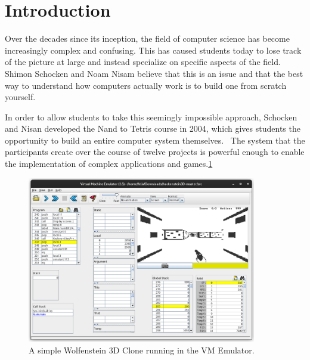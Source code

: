 \section{Introduction}
Over the decades since its inception, the field of computer science has become increasingly complex and confusing.
This has caused students today to lose track of the picture at large and instead specialize on specific aspects of the field.
Shimon Schocken and Noam Nisam believe that this is an issue and that the best way to understand how computers actually work is to build one from scratch yourself.~\cite[Preface]{nisan2005}

In order to allow students to take this seemingly impossible approach, Schocken and Nisan developed the Nand to Tetris course in 2004, which gives students the opportunity to build an entire computer system themselves.~\cite{1408798}
The system that the participants create over the course of twelve projects is powerful enough to enable the implementation of complex applications and games.\ref{fig:hackenstein-official}

\begin{center}
  \begin{figure}[ht]
    \centering
    \includegraphics[width=10cm]{fig/hackenstein-official.png}
    \caption{A simple Wolfenstein 3D Clone running in the VM Emulator.}%
    \label{fig:hackenstein-official}
  \end{figure}
\end{center}

